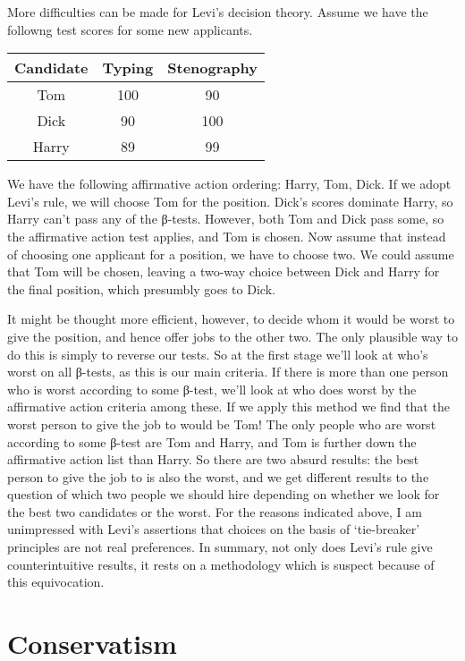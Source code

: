 \documentclass[
  11pt,
  letterpaper,
  DIV=11,
  numbers=noendperiod,
  twoside]{scrartcl}
\begin{document}
More difficulties can be made for Levi's decision theory. Assume we have
the followng test scores for some new applicants.

\begin{longtable}[]{@{}ccc@{}}
\toprule\noalign{}
Candidate & Typing & Stenography \\
\midrule\noalign{}
\endhead
\bottomrule\noalign{}
\endlastfoot
Tom & 100 & 90 \\
Dick & 90 & 100 \\
Harry & 89 & 99 \\
\end{longtable}

We have the following affirmative action ordering: Harry, Tom, Dick. If
we adopt Levi's rule, we will choose Tom for the position. Dick's scores
dominate Harry, so Harry can't pass any of the β-tests. However, both
Tom and Dick pass some, so the affirmative action test applies, and Tom
is chosen. Now assume that instead of choosing one applicant for a
position, we have to choose two. We could assume that Tom will be
chosen, leaving a two-way choice between Dick and Harry for the final
position, which presumbly goes to Dick.

It might be thought more efficient, however, to decide whom it would be
worst to give the position, and hence offer jobs to the other two. The
only plausible way to do this is simply to reverse our tests. So at the
first stage we'll look at who's worst on all β-tests, as this is our
main criteria. If there is more than one person who is worst according
to some β-test, we'll look at who does worst by the affirmative action
criteria among these. If we apply this method we find that the worst
person to give the job to would be Tom! The only people who are worst
according to some β-test are Tom and Harry, and Tom is further down the
affirmative action list than Harry. So there are two absurd results: the
best person to give the job to is also the worst, and we get different
results to the question of which two people we should hire depending on
whether we look for the best two candidates or the worst. For the
reasons indicated above, I am unimpressed with Levi's assertions that
choices on the basis of `tie-breaker' principles are not real
preferences. In summary, not only does Levi's rule give counterintuitive
results, it rests on a methodology which is suspect because of this
equivocation.

\section{Conservatism}\label{conservatism}
\end{document}
